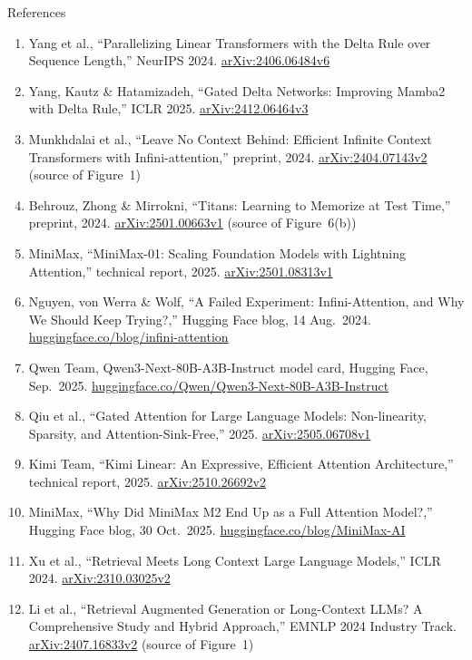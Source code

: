 \begin{frame}[allowframebreaks,t]{References}
\begin{enumerate}
    \item Yang et al., ``Parallelizing Linear Transformers with the Delta Rule over Sequence Length,'' NeurIPS 2024. \href{https://arxiv.org/abs/2406.06484v6}{arXiv:2406.06484v6}
    \item Yang, Kautz \& Hatamizadeh, ``Gated Delta Networks: Improving Mamba2 with Delta Rule,'' ICLR 2025. \href{https://arxiv.org/abs/2412.06464v3}{arXiv:2412.06464v3}
    \item Munkhdalai et al., ``Leave No Context Behind: Efficient Infinite Context Transformers with Infini-attention,'' preprint, 2024. \href{https://arxiv.org/abs/2404.07143v2}{arXiv:2404.07143v2} (source of Figure~1)
    \item Behrouz, Zhong \& Mirrokni, ``Titans: Learning to Memorize at Test Time,'' preprint, 2024. \href{https://arxiv.org/abs/2501.00663v1}{arXiv:2501.00663v1} (source of Figure~6(b))
    \item MiniMax, ``MiniMax-01: Scaling Foundation Models with Lightning Attention,'' technical report, 2025. \href{https://arxiv.org/abs/2501.08313v1}{arXiv:2501.08313v1}
    \item Nguyen, von Werra \& Wolf, ``A Failed Experiment: Infini-Attention, and Why We Should Keep Trying?,'' Hugging Face blog, 14 Aug.\ 2024. \href{https://huggingface.co/blog/infini-attention}{huggingface.co/blog/infini-attention}
    \item Qwen Team, Qwen3-Next-80B-A3B-Instruct model card, Hugging Face, Sep.\ 2025. \href{https://huggingface.co/Qwen/Qwen3-Next-80B-A3B-Instruct}{huggingface.co/Qwen/Qwen3-Next-80B-A3B-Instruct}
    \item Qiu et al., ``Gated Attention for Large Language Models: Non-linearity, Sparsity, and Attention-Sink-Free,'' 2025. \href{https://arxiv.org/abs/2505.06708v1}{arXiv:2505.06708v1}
    \item Kimi Team, ``Kimi Linear: An Expressive, Efficient Attention Architecture,'' technical report, 2025. \href{https://arxiv.org/abs/2510.26692v2}{arXiv:2510.26692v2}
    \item MiniMax, ``Why Did MiniMax M2 End Up as a Full Attention Model?,'' Hugging Face blog, 30 Oct.\ 2025. \href{https://huggingface.co/blog/MiniMax-AI/why-did-m2-end-up-as-a-full-attention-model}{huggingface.co/blog/MiniMax-AI}
    \item Xu et al., ``Retrieval Meets Long Context Large Language Models,'' ICLR 2024. \href{https://arxiv.org/abs/2310.03025v2}{arXiv:2310.03025v2}
    \item Li et al., ``Retrieval Augmented Generation or Long-Context LLMs? A Comprehensive Study and Hybrid Approach,'' EMNLP 2024 Industry Track. \href{https://arxiv.org/abs/2407.16833v2}{arXiv:2407.16833v2} (source of Figure~1)
  \end{enumerate}
\end{frame}
